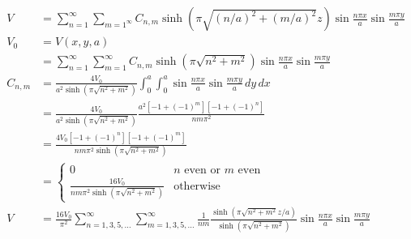 \documentclass{article}
\begin{document}
\begin{align*}
  V        & = \sum_{n = 1}^\infty \sum_{m = 1^\infty} C_{n, m} \sinh \left( \pi \sqrt{(n / a)^2 + (m / a)^2} z \right) \sin \frac{n \pi x}{a} \sin \frac{m \pi y}{a}                                                                                                 \\
  V_0      & = V(x, y, a)                                                                                                                                                                                                                                             \\
           & = \sum_{n = 1}^\infty \sum_{m = 1}^\infty C_{n, m} \sinh \left( \pi \sqrt{n^2 + m^2} \right) \sin \frac{n \pi x}{a} \sin \frac{m \pi y}{a}                                                                                                               \\
  C_{n, m} & = \frac{4 V_0}{a^2 \sinh \left( \pi \sqrt{n^2 + m^2} \right)} \int_0^a \int_0^a \sin \frac{n \pi x}{a} \sin \frac{m \pi y}{a} \,d y \,d x                                                                                                                \\
           & = \frac{4 V_0}{a^2 \sinh \left( \pi \sqrt{n^2 + m^2} \right)} \frac{a^2 [-1 + (-1)^m] [-1 + (-1)^n]}{n m \pi^2}                                                                                                                                          \\
           & = \frac{4 V_0 [-1 + (-1)^n] [-1 + (-1)^m]}{n m \pi^2 \sinh \left( \pi \sqrt{n^2 + m^2} \right)}                                                                                                                                                          \\
           & = \begin{cases}
                 0                                                                  & n \text{ even or } m \text{ even} \\
                 \frac{16 V_0}{n m \pi^2 \sinh \left( \pi \sqrt{n^2 + m^2} \right)} & \text{otherwise}
               \end{cases}                                                                                                                                                 \\
  V        & = \frac{16 V_0}{\pi^2} \sum_{n = 1, 3, 5, \ldots}^\infty \sum_{m = 1, 3, 5, \ldots}^\infty \frac{1}{n m} \frac{\sinh \left( \pi \sqrt{n^2 + m^2} z / a \right)}{\sinh \left( \pi \sqrt{n^2 + m^2} \right)} \sin \frac{n \pi x}{a} \sin \frac{m \pi y}{a}
\end{align*}
\end{document}
